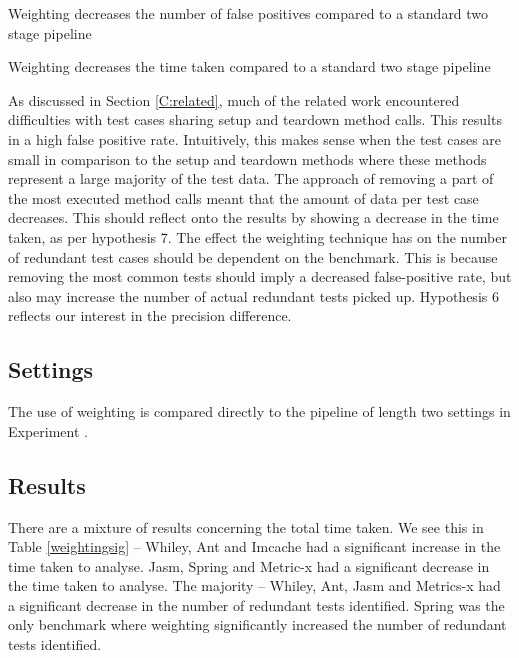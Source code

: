 \begin{hyp}
Weighting decreases the number of false positives compared to a standard two stage pipeline
\end{hyp}

\begin{hyp}
Weighting decreases the time taken compared to a standard two stage pipeline
\end{hyp}

As discussed in Section \ref{C:related}, much of the related work encountered difficulties with test cases sharing setup and teardown method calls. This results in a high false positive rate. Intuitively, this makes sense when the test cases are small in comparison to the setup and teardown methods where these methods represent a large majority of the test data. The approach of removing a part of the most executed method calls meant that the amount of data per test case decreases. This should reflect onto the results by showing a decrease in the time taken, as per hypothesis 7. The effect the weighting technique has on the number of redundant test cases should be dependent on the benchmark. This is because removing the most common tests should imply a decreased false-positive rate, but also may increase the number of actual redundant tests picked up. Hypothesis 6 reflects  our interest in the precision difference.

\subsection{Settings}
The use of weighting is compared directly to the pipeline of length two settings in Experiment .


\subsection{Results}
There are a mixture of results concerning the total time taken. We see this in Table \ref{weightingsig} -- Whiley, Ant and Imcache had a significant increase in the time taken to analyse. Jasm, Spring and Metric-x had a significant decrease in the time taken to analyse. The majority -- Whiley, Ant, Jasm and Metrics-x had a significant decrease in the number of redundant tests identified. Spring was the only benchmark where weighting significantly increased the number of redundant tests identified.

